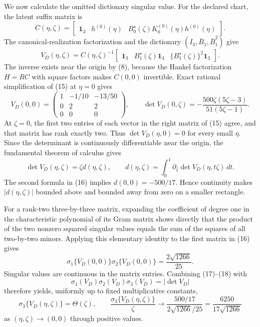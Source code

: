 We now calculate the omitted dictionary singular value. For the declared chart, the latent suffix matrix is
\[
 C(\eta,\zeta)
 =\begin{bmatrix}
 \mathbf 1_3&h^{(0)}(\eta)&B_0^{\star}(\zeta)K_0^{(0)}(\eta)h^{(0)}(\eta)
 \end{bmatrix}.                                               \tag{14}
\]
The canonical-realization factorization and the dictionary \((I_3,\bar B_1,\bar B_1^2)\) give
\[
 V_D(\eta,\zeta)
 =C(\eta,\zeta)^{-1}
 \begin{bmatrix}
 \mathbf 1_3&B_1^{\star}(\zeta)\mathbf 1_3&
 \{B_1^{\star}(\zeta)\}^2\mathbf 1_3
 \end{bmatrix}.                                               \tag{15}
\]
The inverse exists near the origin by (8), because the Hankel factorization \(H=RC\) with square factors makes \(C(0,0)\) invertible. Exact rational simplification of (15) at \(\eta=0\) gives
\[
 V_D(0,0)=
 \begin{pmatrix}1&-1/10&-13/50\\0&2&2\\0&0&0\end{pmatrix},
 \qquad
 \det V_D(0,\zeta)
 =-\frac{500\zeta(5\zeta-3)}{51(5\zeta-1)}.                 \tag{16}
\]
At \(\zeta=0\), the first two entries of each vector in the right matrix of (15) agree, and that matrix has rank exactly two. Thus \(\det V_D(\eta,0)=0\) for every small \(\eta\). Since the determinant is continuously differentiable near the origin, the fundamental theorem of calculus gives
\[
 \det V_D(\eta,\zeta)=\zeta d(\eta,\zeta),
 \qquad
 d(\eta,\zeta)=\int_0^1
 \partial_{\zeta}\det V_D(\eta,t\zeta)\,dt.                \tag{17}
\]
The second formula in (16) implies \(d(0,0)=-500/17\). Hence continuity makes \(|d(\eta,\zeta)|\) bounded above and bounded away from zero on a smaller rectangle.

For a rank-two three-by-three matrix, expanding the coefficient of degree one in the characteristic polynomial of its Gram matrix shows directly that the product of the two nonzero squared singular values equals the sum of the squares of all two-by-two minors. Applying this elementary identity to the first matrix in (16) gives
\[
 \sigma_1\{V_D(0,0)\}\sigma_2\{V_D(0,0)\}
 =\frac{2\sqrt{1266}}{25}.                                   \tag{18}
\]
Singular values are continuous in the matrix entries. Combining (17)--(18) with
\[
 \sigma_1(V_D)\sigma_2(V_D)\sigma_3(V_D)=|\det V_D|          \tag{19}
\]
therefore yields, uniformly up to fixed multiplicative constants,
\[
 \sigma_3\{V_D(\eta,\zeta)\}=\Theta(\zeta),
 \qquad
 \frac{\sigma_3\{V_D(\eta,\zeta)\}}{\zeta}
 \longrightarrow
 \frac{500/17}{2\sqrt{1266}/25}
 =\frac{6250}{17\sqrt{1266}}                                 \tag{20}
\]
as \((\eta,\zeta)\to(0,0)\) through positive values.

